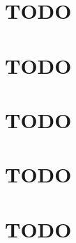 \documentclass[11pt]{article}
\begin{document}
\section{\cite{lubbecke2014assessing}}
\label{sec:org7b0850f}
\section{\cite{maher2018enso}}
\label{sec:orgdd094cf}
\section{\cite{nowack2017role}}
\label{sec:org9238fee}
\section{\cite{phillips2014evaluating}}
\label{sec:org830cbdd}
\section{{\bfseries\sffamily TODO} \cite{rashid2016atmospheric}}
\label{sec:orge93d755}
\section{{\bfseries\sffamily TODO} \cite{ropelewski1987global}}
\label{sec:org47cae0c}
\section{{\bfseries\sffamily TODO} \cite{son2010impact}}
\label{sec:orga87c549}
\section{{\bfseries\sffamily TODO} \cite{stevenson2010enso}}
\label{sec:org6de73f7}
\section{{\bfseries\sffamily TODO} \cite{stevenson2012will}}
\label{sec:org697dce3}
\section{\cite{stevenson2012significant}}
\label{sec:orge1990c0}
\section{\cite{stevenson2017forced}}
\label{sec:orgf634322}

\section{\cite{torrence1998practical}}
\label{sec:org2e0f412}
\end{document}
